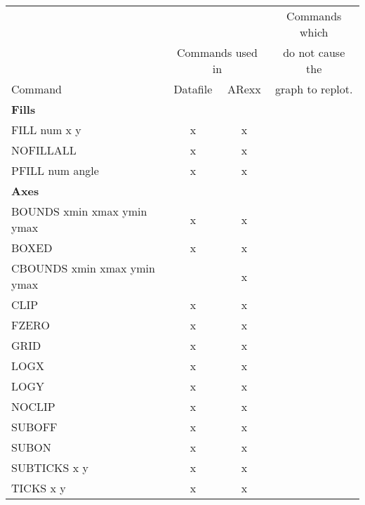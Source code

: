 \documentclass{report}
\begin{document}
\begin{center}
\scriptsize
\begin{tabular}{lccc} \hline
                                 &           &        & Commands which     \\
                                 & \multicolumn{2}{c}{Commands used in} %
                                                      & do not cause the   \\ \cline{2-3}
Command                          & Datafile  & ARexx  & graph to replot.   \\ \hline
{\bf Fills}                      &           &        &                    \\
FILL  num   x   y                &     x     &     x  &                    \\
NOFILLALL                        &     x     &     x  &                    \\
PFILL  num   angle               &     x     &     x  &                    \\ \hline
{\bf Axes}                       &           &        &                    \\
BOUNDS xmin xmax ymin ymax       &     x     &     x  &                    \\
BOXED                            &     x     &     x  &                    \\
CBOUNDS xmin xmax ymin ymax      &           &     x  &                    \\
CLIP                             &     x     &     x  &                    \\
FZERO                            &     x     &     x  &                    \\
GRID                             &     x     &     x  &                    \\
LOGX                             &     x     &     x  &                    \\
LOGY                             &     x     &     x  &                    \\
NOCLIP                           &     x     &     x  &                    \\
SUBOFF                           &     x     &     x  &                    \\
SUBON                            &     x     &     x  &                    \\
SUBTICKS  x   y                  &     x     &     x  &                    \\
TICKS  x   y                     &     x     &     x  &                    \\ \hline

\end{tabular}
\end{center}
\end{document}
